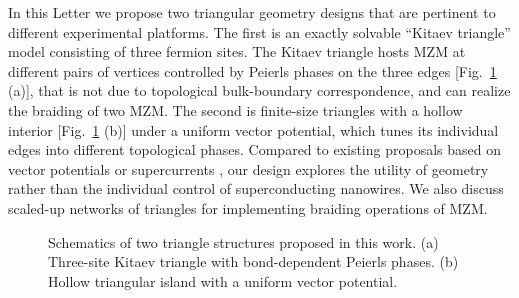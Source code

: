 \documentclass[aps,prb,twocolumn,showpacs,amsmath,amssymb,superscriptaddress]{revtex4-2}
\begin{document}
In this Letter we propose two triangular geometry designs that are pertinent to different experimental platforms. The first is an exactly solvable ``Kitaev triangle'' model consisting of three fermion sites. The Kitaev triangle hosts MZM at different pairs of vertices controlled by Peierls phases on the three edges [Fig.~\ref{fig:triangles} (a)], that is not due to topological bulk-boundary correspondence, and can realize the braiding of two MZM. The second is finite-size triangles with a hollow interior [Fig.~\ref{fig:triangles} (b)] under a uniform vector potential, which tunes its individual edges into different topological phases. Compared to existing proposals based on vector potentials or supercurrents \cite{romitoManipulatingMajoranaFermions2012,takasanSupercurrentinducedTopologicalPhase2022,Hyart_2013,Dmytruk_2019}, our design explores the utility of geometry rather than the individual control of superconducting nanowires. We also discuss scaled-up networks of triangles for implementing braiding operations of MZM.

\begin{figure}[ht]
  \hspace{-18pt}
  \caption{Schematics of two triangle structures proposed in this work. (a) Three-site Kitaev triangle with bond-dependent Peierls phases. (b) Hollow triangular island with a uniform vector potential.}
  \label{fig:triangles}
\end{figure}
\end{document}
